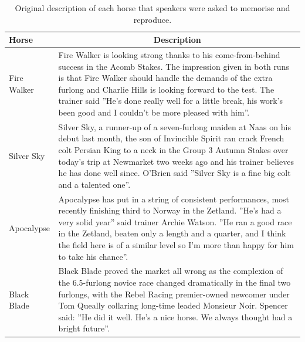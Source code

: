 \documentclass[
  man,floatsintext]{apa7}
\begin{document}
\begin{table}[tbp]

\begin{center}
\begin{threeparttable}

\caption{\label{tab:tab-horse-description-text}Original description of each horse that speakers were asked to memorise and reproduce.}

\begin{tabular}{m{2cm}m{13cm}}
\toprule
Horse & \multicolumn{1}{c}{Description}\\
\midrule
Fire Walker & Fire Walker is looking strong thanks to his come-from-behind success in the Acomb Stakes. The impression given in both runs is that Fire Walker should handle the demands of the extra furlong and Charlie Hills is looking forward to the test. The trainer said ''He's done really well for a little break, his work's been good and I couldn't be more pleased with him''.\\
Silver Sky & Silver Sky, a runner-up of a seven-furlong maiden at Naas on his debut last month, the son of Invincible Spirit ran crack French colt Persian King to a neck in the Group 3 Autumn Stakes over today's trip at Newmarket two weeks ago and his trainer believes he has done well since. O'Brien said ''Silver Sky is a fine big colt and a talented one''.\\
Apocalypse & Apocalypse has put in a string of consistent performances, most recently finishing third to Norway in the Zetland. ''He's had a very solid year'' said trainer Archie Watson. ''He ran a good race in the Zetland, beaten only a length and a quarter, and I think the field here is of a similar level so I'm more than happy for him to take his chance''.\\
Black Blade & Black Blade proved the market all wrong as the complexion of the 6.5-furlong novice race changed dramatically in the final two furlongs, with the Rebel Racing premier-owned newcomer under Tom Queally collaring long-time leaded Monsieur Noir. Spencer said: ''He did it well. He's a nice horse. We always thought had a bright future''.\\
\bottomrule
\end{tabular}

\end{threeparttable}
\end{center}

\end{table}
\end{document}

